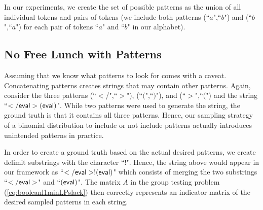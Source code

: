 In our experiments, we create the set of possible patterns as the union of all individual tokens and pairs of tokens (we include both patterns (``$a$",``$b$") and (``$b$",``$a$") for each pair of tokens ``$a$" and ``$b$" in our alphabet).

\subsection{No Free Lunch with Patterns}
Assuming that we know what patterns to look for comes with a caveat. Concatenating patterns creates strings that may contain other patterns. Again, consider the three patterns (``$<$/",``$>$"), (``$($",``$)$"), and (``$>$",``$($") and the string  ``$\sf{</eval>(eval)}$". While two patterns were used to generate the string, the ground truth is that it contains all three patterns. Hence, our sampling strategy of a binomial distribution to include or not include patterns actually introduces unintended patterns in practice. 

In order to create a ground truth based on the actual desired patterns, we create delimit substrings with the character ``$!$".  Hence, the string above would appear in our framework as 
``$\sf{</eval>!(eval)}$" which consists of merging the two substrings ``$\sf{</eval>}$" and ``$\sf{(eval)}$". The matrix $A$ in the group testing problem (\ref{eq:booleanl1minLPslack}) then correctly represents an indicator matrix of the desired sampled patterns in each string.


